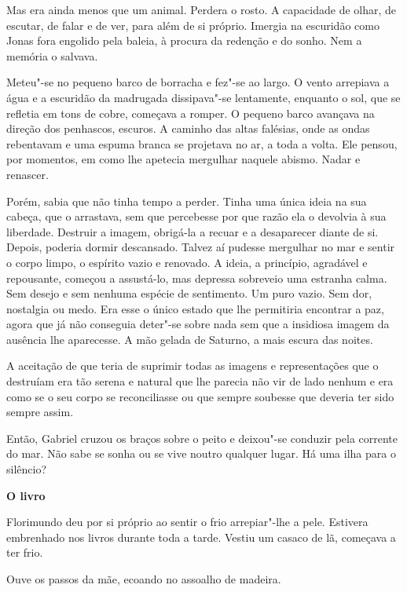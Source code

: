 Mas era ainda menos que um animal. Perdera o rosto. A capacidade de
olhar, de escutar, de falar e de ver, para além de si próprio. Imergia
na escuridão como Jonas fora engolido pela baleia, à procura da redenção
e do sonho. Nem a memória o salvava.

Meteu"-se no pequeno barco de borracha e fez"-se ao largo. O vento
arrepiava a água e a escuridão da madrugada dissipava"-se lentamente,
enquanto o sol, que se refletia em tons de cobre, começava a romper. O
pequeno barco avançava na direção dos penhascos, escuros. A caminho das
altas falésias, onde as ondas rebentavam e uma espuma branca se
projetava no ar, a toda a volta. Ele pensou, por momentos, em como lhe
apetecia mergulhar naquele abismo. Nadar e renascer.

Porém, sabia que não tinha tempo a perder. Tinha uma única ideia na sua
cabeça, que o arrastava, sem que percebesse por que razão ela o devolvia
à sua liberdade. Destruir a imagem, obrigá-la a recuar e a desaparecer
diante de si. Depois, poderia dormir descansado. Talvez aí pudesse
mergulhar no mar e sentir o corpo limpo, o espírito vazio e renovado. A
ideia, a princípio, agradável e repousante, começou a assustá-lo, mas
depressa sobreveio uma estranha calma. Sem desejo e sem nenhuma espécie
de sentimento. Um puro vazio. Sem dor, nostalgia ou medo. Era esse o
único estado que lhe permitiria encontrar a paz, agora que já não
conseguia deter"-se sobre nada sem que a insidiosa imagem da ausência lhe
aparecesse. A mão gelada de Saturno, a mais escura das noites.

A aceitação de que teria de suprimir todas as imagens e representações
que o destruíam era tão serena e natural que lhe parecia não vir de lado
nenhum e era como se o seu corpo se reconciliasse ou que sempre soubesse
que deveria ter sido sempre assim.

Então, Gabriel cruzou os braços sobre o peito e deixou"-se conduzir pela
corrente do mar. Não sabe se sonha ou se vive noutro qualquer lugar. Há
uma ilha para o silêncio?

\pagebreak

\vspace*{1.8cm}
\noindent{}\textbf{O livro}

\bigskip

Florimundo deu por si próprio ao sentir o frio arrepiar"-lhe a pele.
Estivera embrenhado nos livros durante toda a tarde. Vestiu um casaco de
lã, começava a ter frio.

Ouve os passos da mãe, ecoando no assoalho de madeira.

